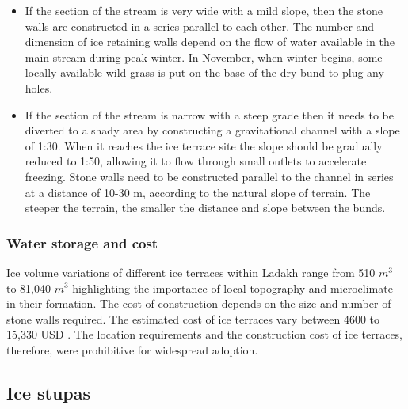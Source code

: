\begin{itemize}

  \item If the section of the stream is very wide with a mild slope, then the stone walls are
    constructed in a series parallel to each other. The number and dimension of ice retaining walls depend on
    the flow of water available in the main stream during peak winter. In November, when winter begins, some
    locally available wild grass is put on the base of the dry bund to plug any holes.

  \item If the section of the stream is narrow with a steep grade then it needs to be diverted to a shady area
    by constructing a gravitational channel with a slope of 1:30. When it reaches the ice terrace site the slope
    should be gradually reduced to 1:50, allowing it to flow through small outlets to accelerate freezing. Stone
    walls need to be constructed parallel to the channel in series at a distance of 10-30 m, according to the
    natural slope of terrain. The steeper the terrain, the smaller the distance and slope between the bunds.

\end{itemize}


\subsubsection{Water storage and cost}

Ice volume variations of different ice terraces within Ladakh  range from 510 $m^3$ to 81,040 $m^3$
\citep{nusserSociohydrologyArtificialGlaciers2019, norphelSnowWaterHarvesting2015} highlighting the importance
of local topography and microclimate in their formation. The cost of construction depends on the size and number
of stone walls required. The estimated cost of ice terraces vary between 4600 to 15,330 USD
\cite{nusserSociohydrologyArtificialGlaciers2019}. The location requirements and the construction cost of ice
terraces, therefore, were prohibitive for widespread adoption.

\subsection{Ice stupas}

